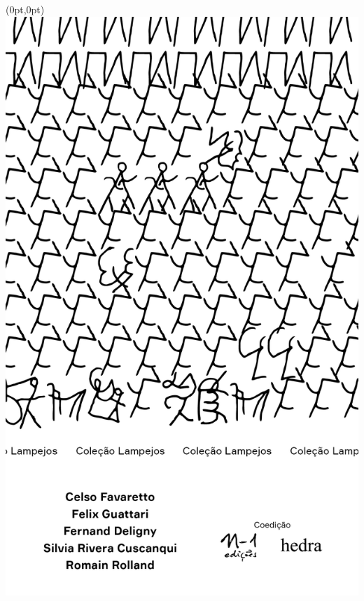 \pagestyle{n-1}
\label{n-1}

\begin{textblock*}{5.625in}(0pt,0pt)%
\vspace*{-2.5cm}
\hspace*{-1.75cm}\includegraphics*[width=147mm]{./imgs/N-1.png}
\end{textblock*}

\pagebreak

\hspace{.5cm}

